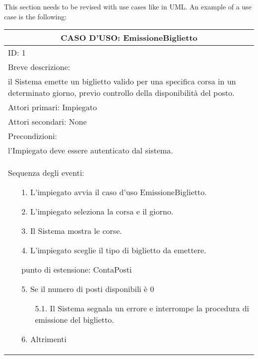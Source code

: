 \documentclass{article}
\begin{document}
This section needs to be revised with use cases like in UML. An example of a use case is the following:
\begin{table}[h!]
	\centering
	\begin{tabular}{|p{}|}
		\hline
		\multicolumn{1}{|c|}{\textbf{CASO D'USO: EmissioneBiglietto}}\\
		\hline
		ID: 1\\
		\hline
		Breve descrizione:\\il Sistema emette un biglietto
valido per una specifica corsa in un determinato
giorno, previo controllo della disponibilità
del posto.\\
		\hline
		Attori primari: Impiegato\\
		\hline
		Attori secondari: None\\
		\hline
		Precondizioni:\\l'Impiegato deve essere
autenticato dal sistema.\\
		\hline
		Sequenza degli eventi:
		\vspace{-0.5\baselineskip}
		\begin{itemize}[leftmargin=1.2em]
			\item[1.] L'impiegato avvia il caso d'uso 
EmissioneBiglietto.
			\vspace{-0.5\baselineskip}
			\item[2.] L'impiegato seleziona la corsa e il giorno.
			\vspace{-0.5\baselineskip}
			\item[3.] Il Sistema mostra le corse.
			\vspace{-0.5\baselineskip}
			\item[4.] L'impiegato sceglie il tipo di biglietto da emettere.
			\vspace{-0.5\baselineskip}
			\item[] punto di estensione: ContaPosti
			\vspace{-0.5\baselineskip}
			\item[5.] Se il numero di posti disponibili è 0
			\vspace{-0.5\baselineskip}
			\begin{itemize}
			\item[5.1.] Il Sistema segnala un errore e 
	interrompe la procedura di emissione del
	biglietto.
			\end{itemize}
			\vspace{-0.8\baselineskip}
			\item[6.] Altrimenti
			\vspace{-0.5\baselineskip}

\end{itemize}
\end{tabular}
\end{table}
\end{document}
